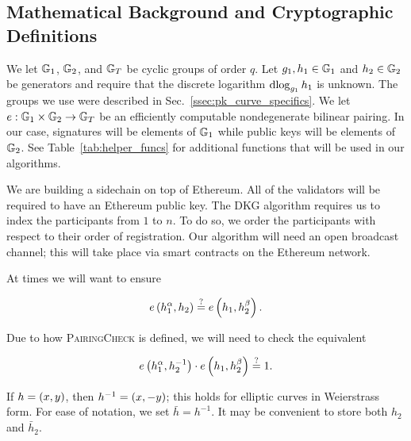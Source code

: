 \subsection{Mathematical Background and Cryptographic Definitions}
\label{ssec:math_def}

We let $\mathbb{G}_{1}$, $\mathbb{G}_{2}$, and $\mathbb{G}_{T}$ be cyclic groups of order $q$.
Let $g_{1}, h_{1}\in\mathbb{G}_{1}$ and $h_{2}\in\mathbb{G}_{2}$ be generators and
require that the discrete logarithm $\operatorname{dlog}_{g_{1}}h_{1}$ is unknown.
The groups we use were described in Sec.~\ref{ssec:pk_curve_specifics}.
We let $e:\mathbb{G}_{1}\times\mathbb{G}_{2}\to\mathbb{G}_{T}$ be an efficiently computable
nondegenerate bilinear pairing.
In our case, signatures will be elements of $\mathbb{G}_{1}$ while
public keys will be elements of $\mathbb{G}_{2}$.
See Table~\ref{tab:helper_funcs} for additional functions
that will be used in our algorithms.



We are building a sidechain on top of Ethereum.
All of the validators will be required to have an Ethereum
public key.
The DKG algorithm requires us to index the participants
from $1$ to $n$.
To do so, we order the participants with respect to their
order of registration.
Our algorithm will need an open broadcast channel;
this will take place via smart contracts on the Ethereum
network.

At times we will want to ensure

\begin{equation}
    e\left( h_{1}^{\alpha},h_{2} \right) \overset{?}{=}
    e\left( h_{1},h_{2}^{\beta} \right).
\end{equation}

\noindent
Due to how \textsc{PairingCheck} is defined, we
will need to check the equivalent

\begin{equation}
    e\left( h_{1}^{\alpha},h_{2}^{-1} \right)\cdot
        e\left( h_{1},h_{2}^{\beta} \right)
        \overset{?}{=} 1.
\end{equation}

\noindent
If $h = \left( x,y \right)$, then $h^{-1} = \left( x,-y \right)$;
this holds for elliptic curves in Weierstrass form.
For ease of notation, we set $\bar{h} = h^{-1}$.
It may be convenient to store both $h_{2}$ and $\bar{h}_{2}$.

